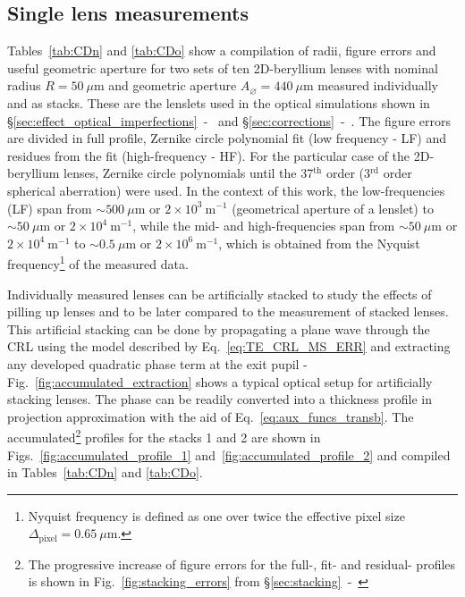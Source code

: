 \begin{refsection}
\subsection{Single lens measurements}\label{sec:single_lens}

Tables~\ref{tab:CDn} and \ref{tab:CDo} show a compilation of radii, figure errors and useful geometric aperture for two sets of ten 2D-beryllium lenses with nominal radius $R=50~\mu\text{m}$ and geometric aperture $A_{\diameter}=440~\mu\text{m}$ measured individually and as stacks. These are the lenslets used in the optical simulations shown in \S\ref{sec:effect_optical_imperfections}~-~\textit{} and \S\ref{sec:corrections}~-~\textit{}. The figure errors are divided in full profile, Zernike circle polynomial fit (low frequency - LF) and residues from the fit (high-frequency - HF). For the particular case of the 2D-beryllium lenses, Zernike circle polynomials until the 37$^\text{th}$ order (3$^\text{rd}$ order spherical aberration) were used. In the context of this work, the low-frequencies (LF) span from $\sim500~\mu$m or $2\times10^{3}~\text{m}^{-1}$ (geometrical aperture of a lenslet) to $\sim50~\mu$m or $2\times10^{4}~\text{m}^{-1}$, while the mid- and high-frequencies span from $\sim50~\mu$m or $2\times10^{4}~\text{m}^{-1}$ to $\sim0.5~\mu$m or $2\times10^{6}~\text{m}^{-1}$, which is obtained from the Nyquist frequency\footnote{Nyquist frequency is defined as one over twice the effective pixel size $\Delta_\text{pixel}=0.65~\mu$m.} of the measured data.

Individually measured lenses can be artificially stacked to study the effects of pilling up lenses and to be later compared to the measurement of stacked lenses. This artificial stacking can be done by propagating a plane wave through the CRL using the model described by Eq.~\ref{eq:TE_CRL_MS_ERR} and extracting any developed quadratic phase term at the exit pupil - Fig.~\ref{fig:accumulated_extraction} shows a typical optical setup for artificially stacking lenses. The phase can be readily converted into a thickness profile in projection approximation with the aid of Eq.~\ref{eq:aux_funcs_transb}. The accumulated\footnote{The progressive increase of figure errors for the full-, fit- and residual- profiles is shown in Fig.~\ref{fig:stacking_errors} from \S\ref{sec:stacking}~-~\textit{}} profiles for the stacks 1 and 2 are shown in Figs.~\ref{fig:accumulated_profile_1} and~\ref{fig:accumulated_profile_2} and compiled in Tables~\ref{tab:CDn} and \ref{tab:CDo}.  


\end{refsection}
